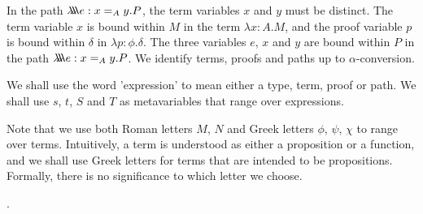 In the path $\lambda \!\! \lambda \!\! \lambda e : x =_A y . P$, the term variables $x$ and $y$ must be distinct.  The term variable $x$ is bound within $M$ in the term $\lambda x:A.M$,
and the proof variable $p$ is bound within $\delta$ in $\lambda p:\phi.\delta$.  The three variables $e$, $x$ and $y$ are bound within $P$ in the path
$\lambda \!\! \lambda \!\! \lambda e:x =_A y.P$.  We identify terms, proofs and paths up to $\alpha$-conversion.

We shall use the word 'expression' to mean either a type, term, proof or path.  We shall use $s$, $t$, $S$ and $T$ as metavariables that range over expressions.

Note that we use both Roman letters $M$, $N$ and Greek letters $\phi$, $\psi$, $\chi$ to range over terms.  Intuitively, a term is understood as either a proposition or a function,
and we shall use Greek letters for terms that are intended to be propositions.  Formally, there is no significance to which letter we choose.

.

